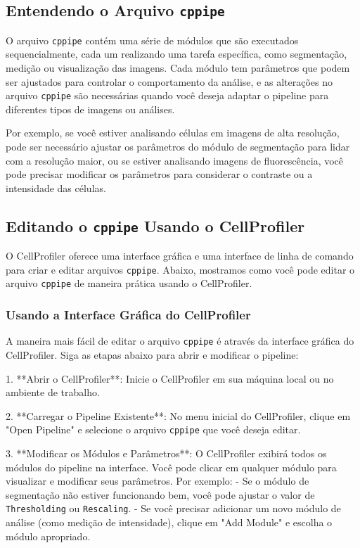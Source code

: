 \documentclass[a4paper, 12pt]{article}
\begin{document}
\subsection{Entendendo o Arquivo \texttt{cppipe}}

O arquivo \texttt{cppipe} contém uma série de módulos que são executados sequencialmente, cada um realizando uma tarefa específica, como segmentação, medição ou visualização das imagens. Cada módulo tem parâmetros que podem ser ajustados para controlar o comportamento da análise, e as alterações no arquivo \texttt{cppipe} são necessárias quando você deseja adaptar o pipeline para diferentes tipos de imagens ou análises.

Por exemplo, se você estiver analisando células em imagens de alta resolução, pode ser necessário ajustar os parâmetros do módulo de segmentação para lidar com a resolução maior, ou se estiver analisando imagens de fluorescência, você pode precisar modificar os parâmetros para considerar o contraste ou a intensidade das células.

\subsection{Editando o \texttt{cppipe} Usando o CellProfiler}

O CellProfiler oferece uma interface gráfica e uma interface de linha de comando para criar e editar arquivos \texttt{cppipe}. Abaixo, mostramos como você pode editar o arquivo \texttt{cppipe} de maneira prática usando o CellProfiler.

\subsubsection{Usando a Interface Gráfica do CellProfiler}

A maneira mais fácil de editar o arquivo \texttt{cppipe} é através da interface gráfica do CellProfiler. Siga as etapas abaixo para abrir e modificar o pipeline:

1. **Abrir o CellProfiler**:
   Inicie o CellProfiler em sua máquina local ou no ambiente de trabalho.

2. **Carregar o Pipeline Existente**:
   No menu inicial do CellProfiler, clique em "Open Pipeline" e selecione o arquivo \texttt{cppipe} que você deseja editar.

3. **Modificar os Módulos e Parâmetros**:
   O CellProfiler exibirá todos os módulos do pipeline na interface. Você pode clicar em qualquer módulo para visualizar e modificar seus parâmetros. Por exemplo:
   - Se o módulo de segmentação não estiver funcionando bem, você pode ajustar o valor de \texttt{Thresholding} ou \texttt{Rescaling}.
   - Se você precisar adicionar um novo módulo de análise (como medição de intensidade), clique em "Add Module" e escolha o módulo apropriado.
\end{document}
